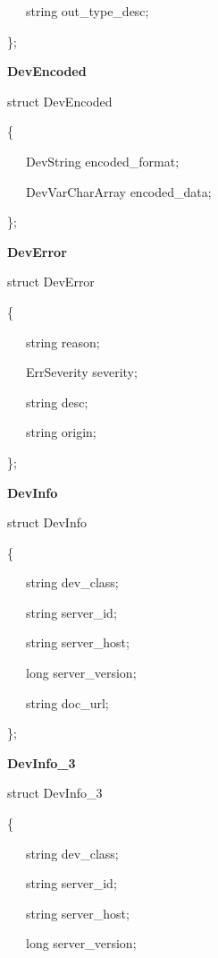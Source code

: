 ~~~string out\_type\_desc;

\};\\


\begin{flushleft}
\textbf{DevEncoded}
\par\end{flushleft}

struct DevEncoded

\{

~~~DevString encoded\_format;

~~~DevVarCharArray encoded\_data;

\};\\


\begin{flushleft}
\textbf{DevError}
\par\end{flushleft}

struct DevError

\{

~~~string reason;

~~~ErrSeverity severity;

~~~string desc;

~~~string origin;

\};\\


\begin{flushleft}
\textbf{DevInfo}
\par\end{flushleft}

struct DevInfo

\{

~~~string dev\_class;

~~~string server\_id;

~~~string server\_host;

~~~long server\_version;

~~~string doc\_url;

\};\\


\begin{flushleft}
\textbf{DevInfo\_3}
\par\end{flushleft}

struct DevInfo\_3

\{

~~~string dev\_class;

~~~string server\_id;

~~~string server\_host;

~~~long server\_version;

